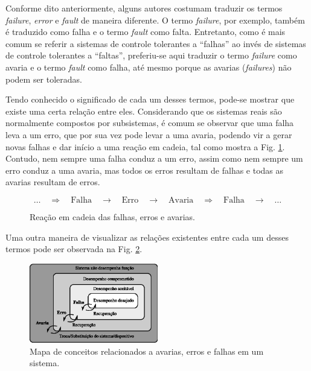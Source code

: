 Conforme dito anteriormente, alguns autores costumam traduzir os termos {\it
failure}, {\it error} e {\it fault} de maneira diferente. O termo {\it failure},
por exemplo, também é traduzido como falha e o termo {\it fault} como falta.
Entretanto, como é mais comum se referir a sistemas de controle tolerantes a
``falhas'' ao invés de sistemas de controle tolerantes a ``faltas'', preferiu-se
aqui traduzir o termo {\it failure} como avaria e o termo {\it fault} como
falha, até mesmo porque as avarias ({\it failures}) não podem ser toleradas.

Tendo conhecido o significado de cada um desses termos, pode-se mostrar que
existe uma certa relação entre eles. Considerando que os sistemas reais são
normalmente compostos por subsistemas, é comum se observar que uma falha leva a
um erro, que por sua vez pode levar a uma avaria, podendo vir a gerar novas
falhas e dar início a uma reação em cadeia, tal como mostra a Fig.
\ref{fig:reacao_cadeia}. Contudo, nem sempre uma falha conduz a um erro, assim
como nem sempre um erro conduz a uma avaria, mas todos os erros resultam de
falhas e todas as avarias resultam de erros.

\begin{figure}[htb]
\centering
\[
\ldots
\quad\Longrightarrow\quad
\text{Falha} 
\quad\longrightarrow\quad
\text{Erro}
\quad\longrightarrow\quad
\text{Avaria}
\quad\Longrightarrow\quad
\text{Falha}
\quad\longrightarrow\quad
\ldots
\]
    \caption{Reação em cadeia das falhas, erros e avarias.}
    \label{fig:reacao_cadeia}
\end{figure}

Uma outra maneira de visualizar as relações existentes entre cada um desses
termos pode ser observada na Fig. \ref{fig:mapa_conceitos}.

\begin{figure}[htb]
\centering
    \includegraphics[width=0.5\textwidth]{imgs/detec_diag/eps/mapa_conceitos}
    \caption{Mapa de conceitos relacionados a avarias, erros e falhas em um
             sistema.}
    \label{fig:mapa_conceitos}
\end{figure}

